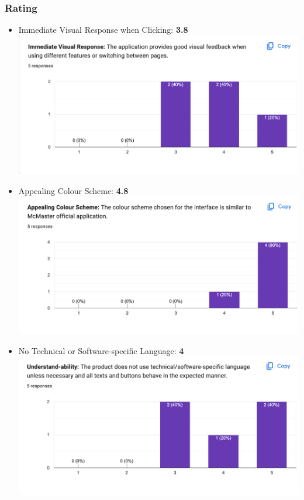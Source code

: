 \documentclass[12pt, titlepage]{article}
\begin{document}
\subsubsection{Rating}
\begin{itemize}
\item Immediate Visual Response when Clicking: \textbf{3.8}\\
\includegraphics[scale=0.4]{Q1.png}
\item Appealing Colour Scheme: \textbf{4.8}\\
\includegraphics[scale=0.4]{Q2.png}
\item No Technical or Software-specific Language: \textbf{4}\\
\includegraphics[scale=0.4]{Q3.png}

\end{itemize}
\end{document}
